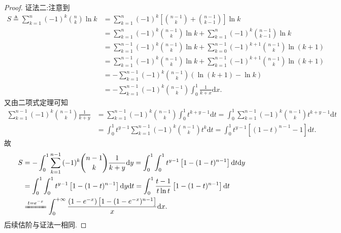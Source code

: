 \documentclass[../../main.tex]{subfiles}
\begin{document}
\begin{proof}
{\color{blue}证法二:}注意到
\begin{align*}
S\triangleq \sum\limits_{k=1}^n{(-1) ^k\binom{n}{k}\ln k}&=\sum\limits_{k=1}^n{(-1) ^k\left[\binom{n-1}{k}+\binom{n-1}{k-1}\right]\ln k}
\\
&=\sum\limits_{k=1}^n{(-1) ^k\binom{n-1}{k}\ln k}+\sum\limits_{k=1}^n{(-1) ^k\binom{n-1}{k-1}\ln k}
\\
&=\sum\limits_{k=1}^{n-1}{(-1) ^k\binom{n-1}{k}\ln k}+\sum\limits_{k=0}^{n-1}{(-1) ^{k+1}\binom{n-1}{k}\ln (k+1)}
\\
&=\sum\limits_{k=1}^{n-1}{(-1) ^k\binom{n-1}{k}\ln k}+\sum\limits_{k=1}^{n-1}{(-1) ^{k+1}\binom{n-1}{k}\ln (k+1)}
\\
&=-\sum\limits_{k=1}^{n-1}{(-1) ^k\binom{n-1}{k}\left(\ln (k+1)-\ln k\right)}
\\
&=-\sum\limits_{k=1}^{n-1}{(-1) ^k\binom{n-1}{k}\int_0^1{\frac{1}{k+x}\mathrm{d}x}}.
\end{align*}
又由二项式定理可知
\begin{align*}
\sum\limits_{k=1}^{n-1}{(-1) ^k\binom{n-1}{k}\frac{1}{k+y}}&=\sum\limits_{k=1}^{n-1}{(-1) ^k\binom{n-1}{k}\int_0^1{t^{k+y-1}\mathrm{d}t}}=\int_0^1{\sum\limits_{k=1}^{n-1}{(-1) ^k\binom{n-1}{k}}t^{k+y-1}\mathrm{d}t}
\\
&=\int_0^1{t^{y-1}\sum\limits_{k=1}^{n-1}{(-1) ^k\binom{n-1}{k}}t^k\mathrm{d}t}=\int_0^1{t^{y-1}\left[(1-t) ^{n-1}-1\right] \mathrm{d}t}.
\end{align*}
故
\begin{align*}
S&=-\int_0^1{\sum\limits_{k=1}^{n-1}{(-1) ^k\binom{n-1}{k}\frac{1}{k+y}}\mathrm{d}y}=\int_0^1{\int_0^1{t^{y-1}\left[1-(1-t) ^{n-1}\right] \mathrm{d}t}\mathrm{d}y}
\\
&=\int_0^1{\int_0^1{t^{y-1}\left[1-(1-t) ^{n-1}\right] \mathrm{d}y}\mathrm{d}t}=\int_0^1{\frac{t-1}{t\ln t}\left[1-(1-t) ^{n-1}\right] \mathrm{d}t}
\\
&\xlongequal{t=e^{-x}}\int_0^{+\infty}{\frac{(1-e^{-x})\left[ 1-(1-e^{-x})^{n-1} \right]}{x}\mathrm{d}x}.
\end{align*}
后续估阶与证法一相同.


\end{proof}
\end{document}
